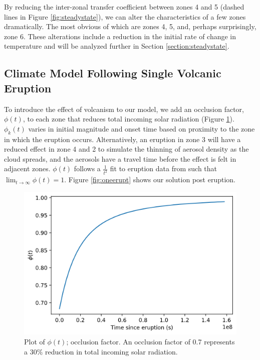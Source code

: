 \documentclass{article}
\begin{document}
By reducing the inter-zonal transfer coefficient between zones 4 and 5 (dashed lines in Figure \ref{fig:steadystate}), we can alter the characteristics of a few zones dramatically. The most obvious of which are zones 4, 5, and, perhaps surprisingly, zone 6. These alterations include a reduction in the initial rate of change in temperature and will be analyzed further in Section \ref{section:steadystate}.

\subsection{Climate Model Following Single Volcanic Eruption}
To introduce the effect of volcanism to our model, we add an occlusion factor, $\phi(t)$, to each zone that reduces total incoming solar radiation (Figure \ref{fig:occlusion}). $\phi_k(t)$ varies in initial magnitude and onset time based on proximity to the zone in which the eruption occurs. Alternatively, an eruption in zone 3 will have a reduced effect in zone 4 and 2 to simulate the thinning of aerosol density as the cloud spreads, and the aerosols have a travel time before the effect is felt in adjacent zones. $\phi(t)$ follows a $\frac{1}{t^2}$ fit to eruption data from \cite{robock} such that $\lim_{t\to\infty}\phi(t) = 1$. Figure \ref{fig:oneerupt} shows our solution post eruption. 

\begin{figure}[htbp]
    \centering
    \includegraphics[scale=0.5]{occlusion.png}
    \caption{Plot of $\phi(t)$; occlusion factor. An occlusion factor of 0.7 represents a $30\%$ reduction in total incoming solar radiation.}
    \label{fig:occlusion}
\end{figure}
\FloatBarrier
\end{document}
